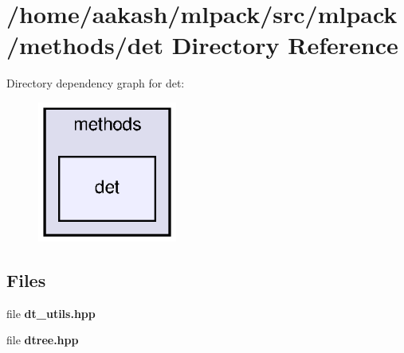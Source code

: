 \section{/home/aakash/mlpack/src/mlpack/methods/det Directory Reference}
\label{dir_829fd86abfc32d55a3f25eeda79942f5}
Directory dependency graph for det\+:
\nopagebreak
\begin{figure}[H]
\begin{center}
\leavevmode
\includegraphics[width=130pt]{dir_829fd86abfc32d55a3f25eeda79942f5_dep}
\end{center}
\end{figure}
\subsection*{Files}
\begin{DoxyCompactItemize}
\item 
file \textbf{ dt\+\_\+utils.\+hpp}
\item 
file \textbf{ dtree.\+hpp}
\end{DoxyCompactItemize}
